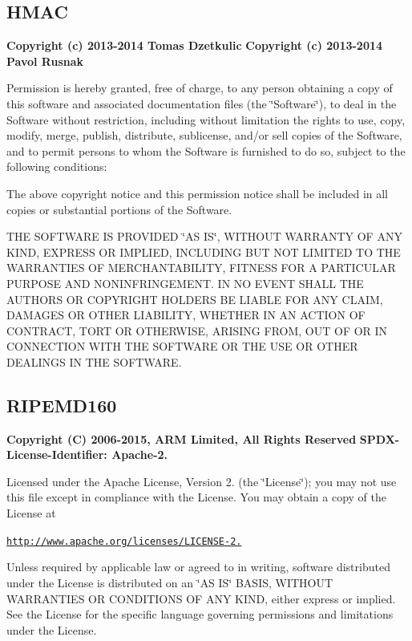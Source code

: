 \subsection*{H\-M\-A\-C}

{\bfseries Copyright (c) 2013-\/2014 Tomas Dzetkulic} {\bfseries Copyright (c) 2013-\/2014 Pavol Rusnak}

Permission is hereby granted, free of charge, to any person obtaining a copy of this software and associated documentation files (the \char`\"{}\-Software\char`\"{}), to deal in the Software without restriction, including without limitation the rights to use, copy, modify, merge, publish, distribute, sublicense, and/or sell copies of the Software, and to permit persons to whom the Software is furnished to do so, subject to the following conditions\-:

The above copyright notice and this permission notice shall be included in all copies or substantial portions of the Software.

T\-H\-E S\-O\-F\-T\-W\-A\-R\-E I\-S P\-R\-O\-V\-I\-D\-E\-D \char`\"{}\-A\-S I\-S\char`\"{}, W\-I\-T\-H\-O\-U\-T W\-A\-R\-R\-A\-N\-T\-Y O\-F A\-N\-Y K\-I\-N\-D, E\-X\-P\-R\-E\-S\-S O\-R I\-M\-P\-L\-I\-E\-D, I\-N\-C\-L\-U\-D\-I\-N\-G B\-U\-T N\-O\-T L\-I\-M\-I\-T\-E\-D T\-O T\-H\-E W\-A\-R\-R\-A\-N\-T\-I\-E\-S O\-F M\-E\-R\-C\-H\-A\-N\-T\-A\-B\-I\-L\-I\-T\-Y, F\-I\-T\-N\-E\-S\-S F\-O\-R A P\-A\-R\-T\-I\-C\-U\-L\-A\-R P\-U\-R\-P\-O\-S\-E A\-N\-D N\-O\-N\-I\-N\-F\-R\-I\-N\-G\-E\-M\-E\-N\-T. I\-N N\-O E\-V\-E\-N\-T S\-H\-A\-L\-L T\-H\-E A\-U\-T\-H\-O\-R\-S O\-R C\-O\-P\-Y\-R\-I\-G\-H\-T H\-O\-L\-D\-E\-R\-S B\-E L\-I\-A\-B\-L\-E F\-O\-R A\-N\-Y C\-L\-A\-I\-M, D\-A\-M\-A\-G\-E\-S O\-R O\-T\-H\-E\-R L\-I\-A\-B\-I\-L\-I\-T\-Y, W\-H\-E\-T\-H\-E\-R I\-N A\-N A\-C\-T\-I\-O\-N O\-F C\-O\-N\-T\-R\-A\-C\-T, T\-O\-R\-T O\-R O\-T\-H\-E\-R\-W\-I\-S\-E, A\-R\-I\-S\-I\-N\-G F\-R\-O\-M, O\-U\-T O\-F O\-R I\-N C\-O\-N\-N\-E\-C\-T\-I\-O\-N W\-I\-T\-H T\-H\-E S\-O\-F\-T\-W\-A\-R\-E O\-R T\-H\-E U\-S\-E O\-R O\-T\-H\-E\-R D\-E\-A\-L\-I\-N\-G\-S I\-N T\-H\-E S\-O\-F\-T\-W\-A\-R\-E.

\subsection*{R\-I\-P\-E\-M\-D160}

{\bfseries Copyright (C) 2006-\/2015, A\-R\-M Limited, All Rights Reserved} {\bfseries S\-P\-D\-X-\/\-License-\/\-Identifier\-: Apache-\/2.}

Licensed under the Apache License, Version 2. (the \char`\"{}\-License\char`\"{}); you may not use this file except in compliance with the License. You may obtain a copy of the License at

\href{http://www.apache.org/licenses/LICENSE-2.0}{\tt http\-://www.\-apache.\-org/licenses/\-L\-I\-C\-E\-N\-S\-E-\/2.}

Unless required by applicable law or agreed to in writing, software distributed under the License is distributed on an \char`\"{}\-A\-S I\-S\char`\"{} B\-A\-S\-I\-S, W\-I\-T\-H\-O\-U\-T W\-A\-R\-R\-A\-N\-T\-I\-E\-S O\-R C\-O\-N\-D\-I\-T\-I\-O\-N\-S O\-F A\-N\-Y K\-I\-N\-D, either express or implied. See the License for the specific language governing permissions and limitations under the License. 